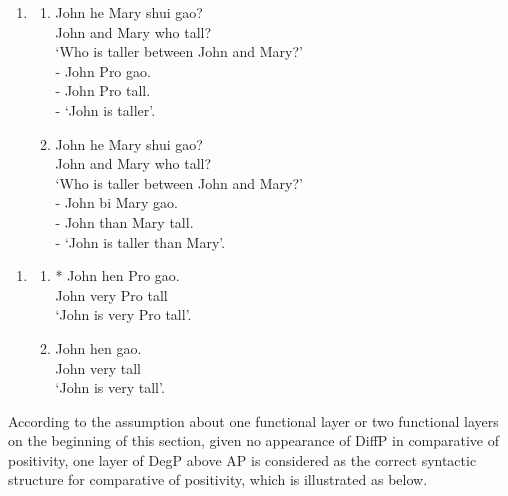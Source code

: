\documentclass{ctexart}
\begin{document}
\begin{enumerate}
    \item \label{positivity_example_2}
    \begin{enumerate}
        \item \label{positivity_example_2_a}
        John he Mary shui gao? \\
        John and Mary who tall? \\
        `Who is taller between John and Mary?' \\
        - John Pro gao.\\
        - John Pro tall. \\
        - `John is taller'.

        \item \label{positivity_example_2_b}
        John he Mary shui gao? \\
        John and Mary who tall? \\
        `Who is taller between John and Mary?' \\
        - John bi Mary gao.\\
        - John than Mary tall. \\
        - `John is taller than Mary'.

    \end{enumerate}
\end{enumerate}

\begin{enumerate}
    \item \label{positivity_example_3}
    \begin{enumerate}
        \item \label{positivity_example_3_a}
        * John hen Pro gao.  \\
        \hspace*{0.5em} John very Pro tall \\
        \hspace*{0.5em} `John is very Pro tall'.

        \item \label{positivity_example_3_b}
        John hen gao.  \\
        John very tall \\
        `John is very tall'.
    \end{enumerate}
\end{enumerate}

According to the assumption about one functional layer or two functional layers on the beginning of this section, given no appearance of DiffP in comparative of positivity, one layer of DegP above AP is considered as the correct syntactic structure for comparative of positivity, which is illustrated as below.
\end{document}
